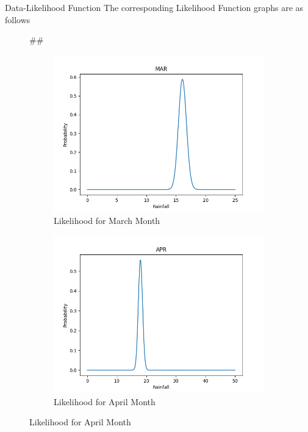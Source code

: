 \documentclass{beamer}
\newenvironment{subcolumns}[1]
 {\valign\bgroup\hsize=#1##\cr}
 {\crcr\egroup}
\newcommand{\nextsubcolumn} {\cr\noalign{\hfill}}
\begin{document}
\begin{frame}{Data-Likelihood Function}
The corresponding Likelihood Function graphs are as follows
\begin{figure}[htp]
\centering
\begin{subcolumns}{0.50\columnwidth}
\begin{subfigure}{0.50\columnwidth}
\centering
\includegraphics[width=\textwidth]{Images/LikeMAR.png}
\caption{Likelihood for March Month}
\end{subfigure}
\nextsubcolumn
\begin{subfigure}{0.5\columnwidth}
\centering
\includegraphics[width=\textwidth]{Images/LikeAPR.png}
\caption{Likelihood for April Month}
\end{subfigure}
\end{subcolumns}
\end{figure}
\end{frame}
\end{document}
